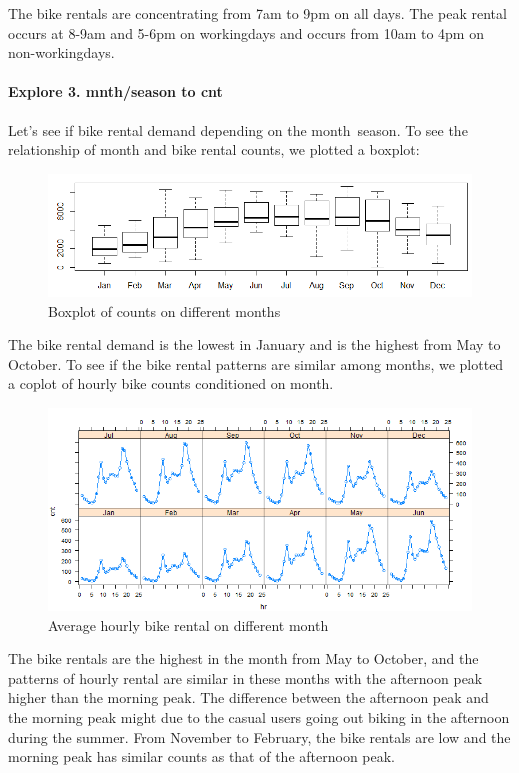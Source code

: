 \documentclass[12pt]{article}
\begin{document}
	The bike rentals are concentrating from 7am to 9pm on all days.  The peak rental occurs at 8-9am and 5-6pm on workingdays and occurs from 10am to 4pm on non-workingdays. 
	
	
	
	\paragraph*{Explore 3. mnth/season to cnt} Let’s see if bike rental demand depending on the month\ season. To see the relationship of month and bike rental counts, we plotted a boxplot: 
	\begin{figure}[H]
		\centering
		\includegraphics[width=\linewidth]{figures/month_count.png}
		\caption{Boxplot of counts on different months}
	\end{figure}
	The bike rental demand is the lowest in January and is the highest from May to October. To see if the bike rental patterns are similar among months, we plotted a coplot of hourly bike counts conditioned on month.
	
	\begin{figure}[H]
		\centering
		\includegraphics[width=\linewidth]{figures/cnt_hr_mnth.png}
		\caption{Average hourly bike rental on different month}
	\end{figure}
	The bike rentals are the highest in the month from May to October, and the patterns of hourly rental are similar in these months with  the afternoon peak higher than the morning peak. The difference between the afternoon peak and the morning peak might due to the casual users going out biking in the afternoon during the summer.  From November to February, the bike rentals are low and the morning peak has similar counts as that of the afternoon peak. 
	
\end{document}
